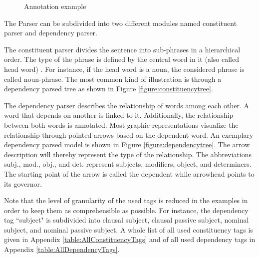 \begin{figure}[h]
	\centering
	\caption{Annotation example}
	\label{figure:nlppipelineexample}
\end{figure}

The Parser can be subdivided into two different modules named constituent parser and dependency parser. 

The constituent parser divides the sentence into sub-phrases in a hierarchical order. The type of the phrase is defined by the central word in it (also called head word) \citep{jurafsky2014speech}. For instance, if the head word is a noun, the considered phrase is called noun-phrase. The most common kind of illustration is through a dependency parsed tree as shown in Figure \ref{figure:constituencytree}.

The dependency parser describes the relationship of words among each other. A word that depends on another is linked to it. Additionally, the relationship between both words is annotated. Most graphic representations visualize the relationship through pointed arrows based on the dependent word. An exemplary dependency parsed model is shown in Figure \ref{figure:dependencytree}. The arrow description will thereby represent the type of the relationship. The abbreviations subj., mod., obj., and det. represent subjects, modifiers, object, and determiners. The starting point of the arrow is called the dependent while arrowhead points to its governor.

Note that the level of granularity of the used tags is reduced in the examples in order to keep them as comprehensible as possible. For instance, the dependency tag ``subject" is subdivided into clausal subject, clausal passive subject, nominal subject, and nominal passive subject. A whole list of all used constituency tags is given in Appendix \ref{table:AllConstituencyTags} and of all used dependency tags in Appendix \ref{table:AllDependencyTags}.

